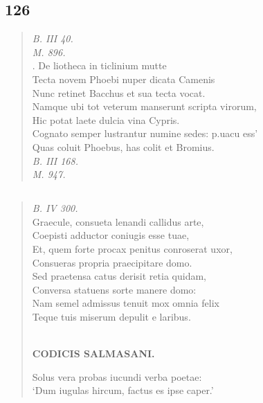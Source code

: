 \documentclass[11pt, a4paper]{report}
\begin{document}
            \subsection*{126}
      \begin{verse}
      \textit{B. III 40.} \\ \textit{M. 896.} \\ .  \lbrack De liotheca in ticlinium mutte \rbrack  \\ Tecta novem Phoebi nuper dicata Camenis \\ Nunc retinet Bacchus et sua tecta vocat. \\ Namque ubi tot veterum manserunt scripta virorum, \\ Hic potat laete dulcia vina Cypris. \\ Cognato semper lustrantur numine sedes: p.uacu ess’ \\ Quas coluit Phoebus, has colit et Bromius. \\ \textit{B. III 168.} \\ \textit{M. 947.} \\ 
      \end{verse}
  
            \subsection*{}
      \begin{verse}
      \textit{B. IV 300.} \\ Graecule, consueta lenandi callidus arte, \\ Coepisti adductor coniugis esse tuae, \\ Et, quem forte procax penitus conroserat uxor, \\ Consueras propria praecipitare domo. \\ Sed praetensa catus derisit retia quidam, \\ Conversa statuens sorte manere domo: \\ Nam semel admissus  \lbrack tenuit mox omnia felix \rbrack  \\ Teque tuis miserum depulit e laribus. \\ 
        ﻿\pagebreak 
    \begin{center} \textbf{CODICIS SALMASANI.} \end{center}Solus vera probas iucundi verba poetae: \\ ‘Dum iugulas hircum, factus es ipse caper.’ \\ 
      \end{verse}
  
\end{document}
